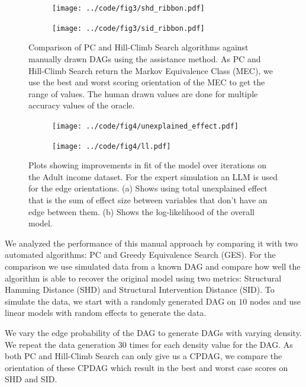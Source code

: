 \documentclass{uai2025} %
\begin{document}
\begin{figure}[t!]
	\centering
	\begin{subfigure}{0.5\textwidth}
		\centering
		\texttt{[image: ../code/fig3/shd\_ribbon.pdf]}
		\caption{}
	\end{subfigure}
	\begin{subfigure}{0.5\textwidth}
		\centering
		\texttt{[image: ../code/fig3/sid\_ribbon.pdf]}
		\caption{}
	\end{subfigure}
	\caption{Comparison of PC and Hill-Climb Search algorithms against
		manually drawn DAGs using the assistance method. As PC and
		Hill-Climb Search return the Markov Equivalence Class (MEC), we
		use the best and worst scoring orientation of the MEC to get
		the range of values. The human drawn values are done for
		multiple accuracy values of the oracle.}
\end{figure}

\begin{figure}[t!]
	\begin{subfigure}{0.25\textwidth}
		\centering
		\texttt{[image: ../code/fig4/unexplained\_effect.pdf]}
		\caption{}
	\end{subfigure}%
	\begin{subfigure}{0.25\textwidth}
		\centering
		\texttt{[image: ../code/fig4/ll.pdf]}
		\caption{}
	\end{subfigure}
	\caption{Plots showing improvements in fit of the model over iterations
	on the Adult income dataset. For the expert simulation an LLM is used
	for the edge orientations. (a) Shows using total unexplained effect that is the
	sum of effect size between variables that don't have an edge between them. (b)
	Shows the log-likelihood of the overall model.
	}
\end{figure}

We analyzed the performance of this manual approach by comparing it with two
automated algorithms: PC and Greedy Equivalence Search (GES). For the
comparison we use simulated data from a known DAG and compare how well the
algorithm is able to recover the original model using two metrics: Structural
Hamming Distance (SHD) and Structural Intervention Distance (SID). To simulate
the data, we start with a randomly generated DAG on $ 10 $ nodes and use linear
models with random effects to generate the data. 

We vary the edge probability of the DAG to generate DAGs with varying density.
We repeat the data generation $ 30 $ times for each density value for the DAG.
As both PC and Hill-Climb Search can only give us a CPDAG, we compare the
orientation of these CPDAG which result in the best and worst case scores on
SHD and SID.
\end{document}
